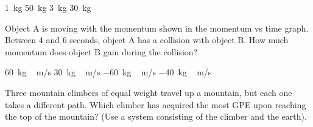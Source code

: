 \documentclass[answers]{exam}
\begin{document}
\begin{questions}
\begin{randomizechoices}[norandomize]
    \choice \SI{1}{kg}
    \choice \SI{50}{kg}
    \choice \SI{3}{kg}
    \correctchoice \SI{30}{kg}
\end{randomizechoices}

\question
Object A is moving with the momentum shown in the momentum vs time graph. Between 4 and 6 seconds, object A has a collision with object B. How much momentum does object B gain during the collision?

\begin{minipage}{0.3\textwidth}
\centering
    \begin{randomizechoices}[norandomize]
        \correctchoice \SI{60}{kg\,m/s}
        \choice \SI{30}{kg\,m/s}
        \choice \SI{-60}{kg\,m/s}
        \choice \SI{-40}{kg\,m/s}
    \end{randomizechoices}
\end{minipage}%
\begin{minipage}{0.6\textwidth}
\centering
\end{minipage}



\question
Three mountain climbers of equal weight travel up a mountain, but each one takes a different path. Which climber has acquired the most GPE upon reaching the top of the mountain? (Use a system consisting of the climber and the earth).


\end{questions}
\end{document}
